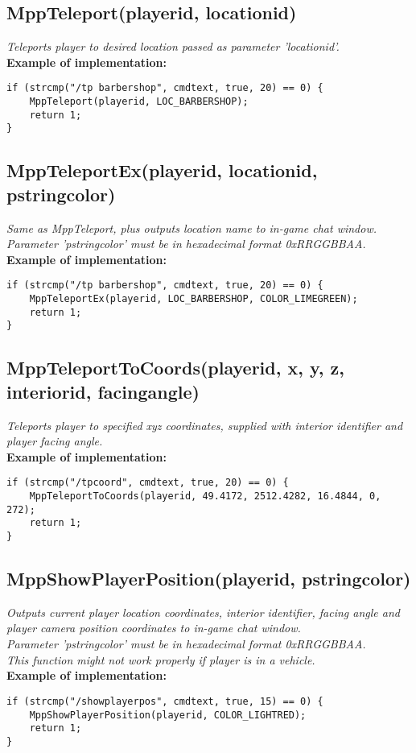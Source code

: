 \documentclass{article}
\begin{document}
\subsection{MppTeleport(playerid, locationid)}
\textit{Teleports player to desired location passed as parameter 'locationid'.}
\bigskip
\\\textbf{Example of implementation:}
\begin{verbatim}
if (strcmp("/tp barbershop", cmdtext, true, 20) == 0) {
    MppTeleport(playerid, LOC_BARBERSHOP);
    return 1;
}
\end{verbatim}


\subsection{MppTeleportEx(playerid, locationid, pstringcolor)}
\textit{Same as MppTeleport, plus outputs location name to in-game chat window. \\Parameter 'pstringcolor' must be in hexadecimal format 0xRRGGBBAA.}
\bigskip
\\\textbf{Example of implementation:}
\begin{verbatim}
if (strcmp("/tp barbershop", cmdtext, true, 20) == 0) {
    MppTeleportEx(playerid, LOC_BARBERSHOP, COLOR_LIMEGREEN);
    return 1;
}
\end{verbatim}


\subsection{MppTeleportToCoords(playerid, x, y, z, interiorid, facingangle)}
\textit{Teleports player to specified xyz coordinates, supplied with interior identifier and player facing angle.}
\bigskip
\\\textbf{Example of implementation:}
\begin{verbatim}
if (strcmp("/tpcoord", cmdtext, true, 20) == 0) {
    MppTeleportToCoords(playerid, 49.4172, 2512.4282, 16.4844, 0, 272);
    return 1;
}
\end{verbatim}


\newpage
\subsection{MppShowPlayerPosition(playerid, pstringcolor)}
\textit{Outputs current player location coordinates, interior identifier, facing angle and player camera position coordinates to in-game chat window.
\\Parameter 'pstringcolor' must be in hexadecimal format 0xRRGGBBAA.
\\This function might not work properly if player is in a vehicle.}
\bigskip
\\\textbf{Example of implementation:}
\begin{verbatim}
if (strcmp("/showplayerpos", cmdtext, true, 15) == 0) {
    MppShowPlayerPosition(playerid, COLOR_LIGHTRED);
    return 1;
}
\end{verbatim}
\end{document}
